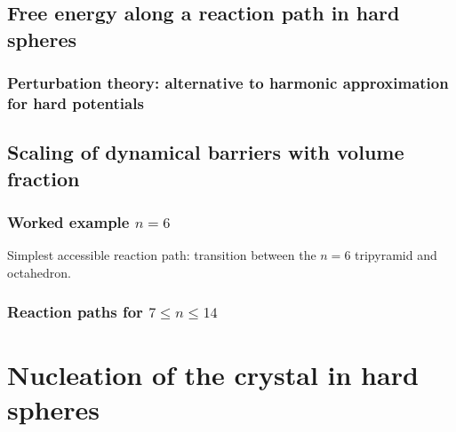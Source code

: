 \documentclass[12pt]{report}
\begin{document}
\subsection{Free energy along a reaction path in hard spheres}
\subsubsection{Perturbation theory: alternative to harmonic approximation for hard potentials}
\subsection{Scaling of dynamical barriers with volume fraction}
\subsubsection{Worked example $n = 6$}
Simplest accessible reaction path: transition between the $n = 6$ tripyramid and octahedron.
\subsubsection{Reaction paths for $7 \le n \le 14$}

\section{Nucleation of the crystal in hard spheres}
\end{document}
